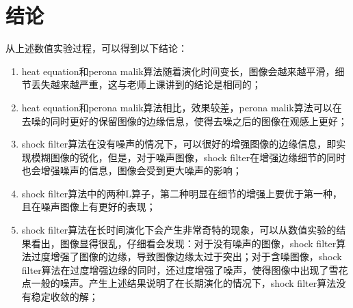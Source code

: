 \documentclass[a4paper, UTF8]{ctexrep}
\begin{document}
		\section{结论}
			从上述数值实验过程，可以得到以下结论：
			\begin{enumerate}
				\item heat equation和perona malik算法随着演化时间变长，图像会越来越平滑，细节丢失越来越严重，这与老师上课讲到的结论是相同的；
				\item heat equation和perona malik算法相比，效果较差，perona malik算法可以在去噪的同时更好的保留图像的边缘信息，使得去噪之后的图像在观感上更好；
				\item shock filter算法在没有噪声的情况下，可以很好的增强图像的边缘信息，即实现模糊图像的锐化，但是，对于噪声图像，shock filter在增强边缘细节的同时也会增强噪声的信息，图像会受到更大噪声的影响；
				\item shock filter算法中的两种L算子，第二种明显在细节的增强上要优于第一种，且在噪声图像上有更好的表现；
				\item shock filter算法在长时间演化下会产生非常奇特的现象，可以从数值实验的结果看出，图像显得很乱，仔细看会发现：对于没有噪声的图像，shock filter算法过度增强了图像的边缘，导致图像边缘太过于突出；对于含噪图像，shock filter算法在过度增强边缘的同时，还过度增强了噪声，使得图像中出现了雪花点一般的噪声。产生上述结果说明了在长期演化的情况下，shock filter算法没有稳定收敛的解；
			\end{enumerate}
\end{document}
